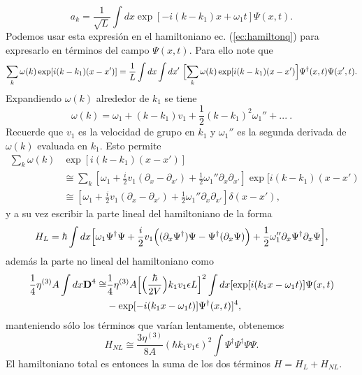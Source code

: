 \begin{equation}
a_k=\frac{1}{\sqrt{L}}\int dx\exp[-i(k-k_1)x+\omega_1t]\Psi(x,t).
\end{equation}
Podemos usar esta expresi\'{o}n en el hamiltoniano ec. (\ref{ec:hamiltonq}) para expresarlo en t\'{e}rminos del campo $\Psi(x,t)$. Para ello note que
\begin{align*}
\sum_k\omega(k)\exp[i(k-k_1)(x-x')]=\frac{1}{L}\int dx\int dx'\ \Bigl[\sum_k \omega(k)\exp[i(k-k_1)(x-x')\Bigr]\Psi^{\dagger}(x,t)\Psi(x',t).
\end{align*}
Expandiendo $\omega(k)$ alrededor de $k_1$ se tiene  
\begin{equation}
\omega(k)=\omega_1+(k-k_1)v_1+\frac{1}{2}(k-k_1)^2\omega_1''+...\ .
\end{equation}
Recuerde que $v_1$ es la velocidad de grupo en $k_1$ y $\omega_1''$ es la segunda derivada de $\omega(k)$ evaluada en $k_1$. Esto permite
\begin{align}
\nonumber  \sum_k  \omega(k) & \exp[i(k-k_1)(x-x')]\\
\nonumber & \cong \sum_k[\omega_1+\frac{i}{2}v_1(\partial_x-\partial_{x'}) +\frac{1}{2}\omega_1''\partial_x\partial_{x'}]\exp[i(k-k_1)(x-x')\\
&\cong [\omega_1+\frac{i}{2}v_1(\partial_x-\partial_{x'})+ \frac{1}{2}\omega_1''\partial_x\partial_{x'}]\delta(x-x'),
\end{align}
y a su vez escribir la parte lineal del hamiltoniano de la forma
\begin{align}
H_{L}=\hbar\int dx \Bigl[\omega_1\Psi^{\dagger}\Psi+\frac{i}{2}v_1\Bigl((\partial_x\Psi^{\dagger})\Psi-\Psi^{\dagger}(\partial_x\Psi)\Bigr)+\frac{1}{2}\omega_1''\partial_x\Psi^{\dagger}\partial_x\Psi\Bigr],
\end{align}
adem\'{a}s la parte no lineal del hamiltoniano como
\begin{align}
\nonumber  \frac{1}{4}\eta^{(3)}A\int dx \textbf{D}^4\cong & \frac{1}{4}\eta^{(3)}A\Bigl[\Bigl(\frac{\hbar}{2V}\Bigr)k_1v_1\epsilon L\Bigr]^2\int dx [\exp[i(k_1x-\omega_1 t)]\Psi(x,t)\\
&-\exp[-i(k_1x-\omega_1 t)]\Psi^{\dagger}(x,t)]^4,
\end{align}
manteniendo sólo los términos que varían lentamente, obtenemos
\begin{equation}
H_{NL}\cong \frac{3\eta^{(3)}}{8A}(\hbar k_1 v_1\epsilon)^2\int \Psi^{\dagger}\Psi^{\dagger}\Psi\Psi.
\end{equation}
El hamiltoniano total es entonces la suma de los dos términos $H=H_{L}+H_{NL}$.
